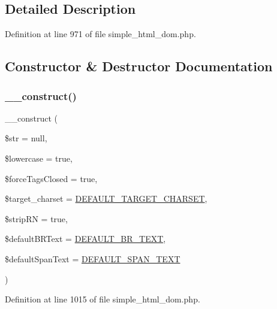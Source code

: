 \subsection{Detailed Description}


Definition at line 971 of file simple\+\_\+html\+\_\+dom.\+php.



\subsection{Constructor \& Destructor Documentation}
\hypertarget{classsimple__html__dom_a867090eb38a7d76f8df0b46d22a5226a}{}\label{classsimple__html__dom_a867090eb38a7d76f8df0b46d22a5226a} 
\subsubsection{\texorpdfstring{\+\_\+\+\_\+construct()}{\_\_construct()}}
{\footnotesize\ttfamily \+\_\+\+\_\+construct (\begin{DoxyParamCaption}\item[{}]{\$str = {\ttfamily null},  }\item[{}]{\$lowercase = {\ttfamily true},  }\item[{}]{\$force\+Tags\+Closed = {\ttfamily true},  }\item[{}]{\$target\+\_\+charset = {\ttfamily \hyperlink{simple__html__dom_8php_aeb01f6d83a65d695ad327473f838319a}{D\+E\+F\+A\+U\+L\+T\+\_\+\+T\+A\+R\+G\+E\+T\+\_\+\+C\+H\+A\+R\+S\+ET}},  }\item[{}]{\$strip\+RN = {\ttfamily true},  }\item[{}]{\$default\+B\+R\+Text = {\ttfamily \hyperlink{simple__html__dom_8php_a898bdf60fe4d05c1c50013eed5e2c6e8}{D\+E\+F\+A\+U\+L\+T\+\_\+\+B\+R\+\_\+\+T\+E\+XT}},  }\item[{}]{\$default\+Span\+Text = {\ttfamily \hyperlink{simple__html__dom_8php_a30d58d7d3a53efc61f064b53a434bafe}{D\+E\+F\+A\+U\+L\+T\+\_\+\+S\+P\+A\+N\+\_\+\+T\+E\+XT}} }\end{DoxyParamCaption})}



Definition at line 1015 of file simple\+\_\+html\+\_\+dom.\+php.


